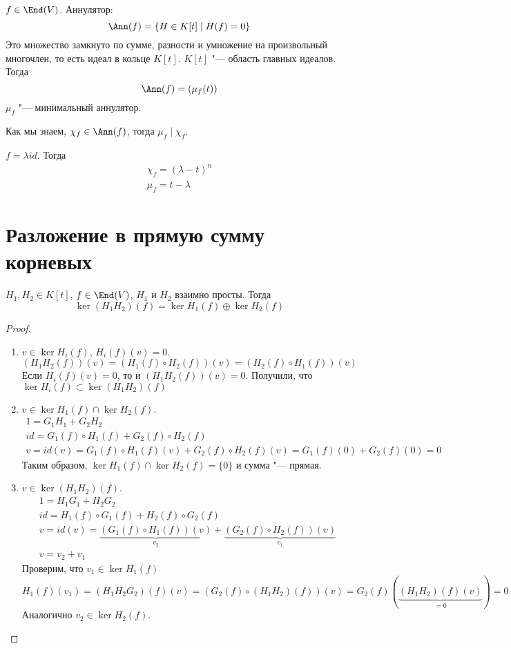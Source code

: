 \begin{Rem}
	$f \in \End(V)$.
	Аннулятор:
	\[ \Ann(f) = \{H \in K[t] \mid H(f) = 0\} \]
	Это множество замкнуто по сумме, разности и умножение на произвольный многочлен, то есть идеал в кольце $K[t]$.
	$K[t]$ "--- область главных идеалов.
	Тогда
	\[ \Ann(f) = \left( \mu_f(t) \right) \]
	$\mu_f$ "--- минимальный аннулятор.

	Как мы знаем, $\chi_f \in \Ann(f)$, тогда $\mu_f \mid \chi_f$.
\end{Rem}

\begin{exmp}
	$f = \lambda id$.
	Тогда
	\begin{gather*}
		\chi_f = (\lambda - t)^n \\
		\mu_f = t - \lambda
	\end{gather*}
\end{exmp}

\section{Разложение в прямую сумму корневых}

\begin{theorem}
	$H_1, H_2 \in K[t]$, $f \in \End(V)$, $H_1$ и $H_2$ взаимно просты.
	Тогда 
	\[  \ker (H_1H_2)(f) = \ker H_1(f) \oplus \ker H_2(f) \]
\end{theorem}
\begin{proof}
	\begin{enumerate}
	\item
		$v \in \ker H_i(f)$, $H_i(f)(v) = 0$.
		\[ (H_1H_2(f))(v) = (H_1(f) \circ H_2(f))(v) = (H_2(f) \circ H_1(f))(v) \]
		Если $H_i(f)(v) = 0$, то и $(H_1H_2(f))(v) = 0$.
		Получили, что $\ker H_i(f) \subset \ker (H_1H_2)(f)$

	\item
		$v \in \ker H_1(f) \cap \ker H_2(f)$.
		\begin{gather*}
			1 = G_1 H_1 + G_2 H_2 \\
			id = G_1(f) \circ H_1(f) + G_2(f) \circ H_2(f) \\
			v = id(v) = G_1(f) \circ H_1(f)(v) + G_2(f) \circ H_2(f)(v) = G_1(f)(0) + G_2(f)(0) = 0
		\end{gather*}
		Таким образом, $\ker H_1(f) \cap \ker H_2(f) = \{0\}$ и сумма "--- прямая.

	\item
		$v \in \ker(H_1H_2)(f)$.
		\begin{gather*}
			1 = H_1 G_1 + H_2 G_2 \\
			id = H_1(f) \circ G_1(f) + H_2(f) \circ G_2(f) \\
			v = id(v) = \underbrace{(G_1(f) \circ H_1(f))(v)}_{v_2} + \underbrace{(G_2(f) \circ H_2(f))(v)}_{v_1} \\
			v = v_2 + v_1
		\end{gather*}
		Проверим, что $v_1 \in \ker H_1(f)$
		\[ H_1(f)(v_1) = (H_1H_2G_2)(f)(v) = (G_2(f) \circ (H_1H_2)(f))(v) = G_2(f)(\underbrace{(H_1H_2)(f)(v)}_{=0}) = 0 \]
		Аналогично $v_2 \in \ker H_2(f)$.
	\end{enumerate}
\end{proof}

